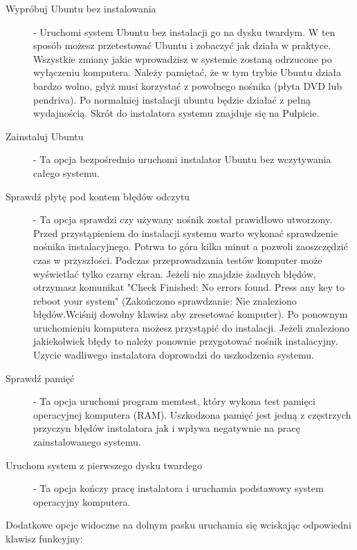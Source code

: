 \begin{description}
\item[Wypróbuj Ubuntu bez instalowania] - Uruchomi system Ubuntu bez instalacji go na dysku twardym. W ten sposób możesz przetestować Ubuntu i zobaczyć jak działa w praktyce. Wszystkie zmiany jakie wprowadzisz w systemie zostaną odrzucone po wyłączeniu komputera. Należy pamiętać, że w tym trybie Ubuntu działa bardzo wolno, gdyż musi korzystać z powolnego nośnika (płyta DVD lub pendriva). Po normalniej instalacji ubuntu będzie działać z pełną wydajnością. Skrót do instalatora systemu znajduje się na Pulpicie.
\item[Zainstaluj Ubuntu] - Ta opcja bezpośrednio uruchomi instalator Ubuntu bez wczytywania całego systemu.
\item[Sprawdź płytę pod kontem błędów odczytu] - Ta opcja sprawdzi czy używany nośnik został prawidłowo utworzony.\\
Przed przystąpieniem do instalacji systemu warto wykonać sprawdzenie nośnika instalacyjnego. Potrwa to góra kilka minut a pozwoli zaoszczędzić czas w przyszłości. Podczas przeprowadzania testów komputer może wyświetlać tylko czarny ekran. Jeżeli nie znajdzie żadnych błędów, otrzymasz komunikat "Check Finished: No errors found. Press any key to reboot your system" (Zakończono sprawdzanie: Nie znaleziono błędów.Wciśnij dowolny klawisz aby zresetować komputer). Po ponownym uruchomieniu komputera możesz przystąpić do instalacji. Jeżeli znaleziono jakiekolwiek błędy to należy ponownie przygotować nośnik instalacyjny. Uzycie wadliwego instalatora doprowadzi do uszkodzenia systemu. 
\item[Sprawdź pamięć] - Ta opcja uruchomi program memtest, który wykona test pamięci operacyjnej komputera (RAM). Uszkodzona pamięć jest jedną z częstrzych przyczyn błędów instalatora jak i wpływa negatywnie na pracę zainstalowanego systemu.
\item[Uruchom system z pierwszego dysku twardego] - Ta opcja kończy pracę instalatora i uruchamia podstawowy system operacyjny komputera.
\end{description}
Dodatkowe opcje widoczne na dolnym pasku uruchamia się wciskając odpowiedni klawisz funkcyjny:
